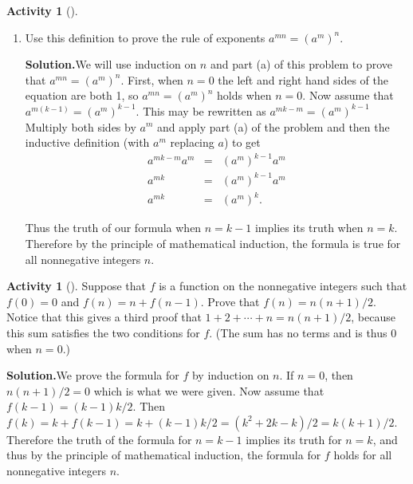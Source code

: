\documentclass[10pt,]{book}
\theoremstyle{plain}
\theoremstyle{definition}
\newtheorem{activity}[project]{Activity}
\numberwithin{equation}{chapter}
\newcommand{\amp}{&}
\begin{document}
\begin{activity}[]
\begin{enumerate}[label=(\alph*)]
~\par
\item Use this definition to prove the rule of exponents \(a^{mn} =
(a^m)^n\).%
\par\medskip\noindent%
\textbf{Solution.}\quad We will use induction on \(n\) and part (a) of this problem to prove that \(a^{mn}=(a^m)^n\). First, when \(n=0\) the left and right hand sides of the equation are both 1, so \(a^{mn}=(a^m)^n\) holds when \(n=0\). Now assume that \(a^{m(k-1)} =(a^m)^{k-1}\). This may be rewritten as \(a^{mk-m}=(a^m)^{k-1}\) Multiply both sides by \(a^m\) and apply part (a) of the problem and then the inductive definition (with \(a^m\) replacing \(a\)) to get%
\begin{align*}
a^{mk-m}a^m\amp =\amp (a^m)^{k-1}a^m\\
a^{mk}\amp =\amp (a^m)^{k-1}a^m\\
a^{mk}\amp =\amp (a^m)^k.
\end{align*}
%
\par
Thus the truth of our formula when \(n=k-1\) implies its truth when \(n=k\). Therefore by the principle of mathematical induction, the formula is true for all nonnegative integers \(n\).%

\end{enumerate}
\end{activity}
\begin{activity}[]\label{activity-75}
Suppose that \(f\) is a function on the nonnegative integers such that \(f(0)=0\) and \(f(n) = n+f(n-1)\). Prove that \(f(n) = n(n+1)/2\). Notice that this gives a third proof that \(1+2+\cdots+n=n(n+1)/2\), because this sum satisfies the two conditions for \(f\). (The sum has no terms and is thus 0 when \(n=0\).)%
\par\medskip\noindent%
\textbf{Solution.}\quad We prove the formula for \(f\) by induction on \(n\). If \(n=0\), then \(n(n+1)/2=0\) which is what we were given. Now assume that \(f(k-1)=
(k-1)k/2\). Then \(f(k)= k+f(k-1)= k+(k-1)k/2=(k^2+2k-k)/2=k(k+1)/2\). Therefore the truth of the formula for \(n=k-1\) implies its truth for \(n=k\), and thus by the principle of mathematical induction, the formula for \(f\) holds for all nonnegative integers \(n\).%
\end{activity}
\end{document}
